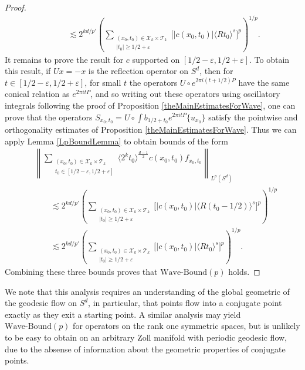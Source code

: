 \begin{proof}
\begin{equation}
\begin{split}
        &\quad\quad \lesssim 2^{kd/p'} \left( \sum\nolimits_{\substack{(x_0,t_0) \in \mathcal{X}_k \times \mathcal{T}_k\\|t_0| \geq 1/2 + \varepsilon}} \Big[ |c(x_0,t_0)| \langle R t_0 \rangle^{s} \Big]^p \right)^{1/p}.
    \end{split}
    \end{equation}
    It remains to prove the result for $c$ supported on $[1/2 - \varepsilon, 1/2 + \varepsilon]$. To obtain this result, if $Ux = -x$ is the reflection operator on $S^d$, then for $t \in [1/2 - \varepsilon, 1/2 + \varepsilon]$, for small $t$ the operators $U \circ e^{2 \pi i (t + 1/2) P}$ have the same conical relation as $e^{2 \pi i t P}$, and so writing out these operators using oscillatory integrals following the proof of Proposition \ref{theMainEstimatesForWave}, one can prove that the operators $S\!_{x_0,t_0} = U \circ \int b_{1/2 + t_0} e^{2 \pi i t P} \{ u_{x_0} \}$ satisfy the pointwise and orthogonality estimates of Proposition \ref{theMainEstimatesForWave}. Thus we can apply Lemma \ref{LpBoundLemma} to obtain bounds of the form
    \begin{equation}
    \begin{split}
        &\left\| \sum\nolimits_{\substack{(x_0,t_0) \in \mathcal{X}_k \times \mathcal{T}_k\\t_0 \in [1/2 - \varepsilon, 1/2 + \varepsilon]}} \langle 2^k t_0 \rangle^{\frac{d-1}{2}} c(x_0,t_0) f_{x_0,t_0} \right\|_{L^p(S^d)} \\
        &\quad\quad \lesssim 2^{kd/p'} \left( \sum\nolimits_{\substack{(x_0,t_0) \in \mathcal{X}_k \times \mathcal{T}_k\\|t_0| \geq 1/2 + \varepsilon}} \Big[ |c(x_0,t_0)| \langle R (t_0 - 1/2) \rangle^{s} \Big]^p \right)^{1/p}\\
        &\quad\quad \lesssim 2^{kd/p'} \left( \sum\nolimits_{\substack{(x_0,t_0) \in \mathcal{X}_k \times \mathcal{T}_k\\|t_0| \geq 1/2 + \varepsilon}} \Big[ |c(x_0,t_0)| \langle R t_0 \rangle^{s} \Big]^p \right)^{1/p}.
    \end{split}
    \end{equation}
    Combining these three bounds proves that $\text{Wave-Bound}(p)$ holds.
\end{proof}

\begin{remark}
    We note that this analysis requires an understanding of the global geometric of the geodesic flow on $S^d$, in particular, that points flow into a conjugate point exactly as they exit a starting point. A similar analysis may yield $\text{Wave-Bound}(p)$ for operators on the rank one symmetric spaces, but is unlikely to be easy to obtain on an arbitrary Zoll manifold with periodic geodesic flow, due to the absense of information about the geometric properties of conjugate points.
\end{remark}